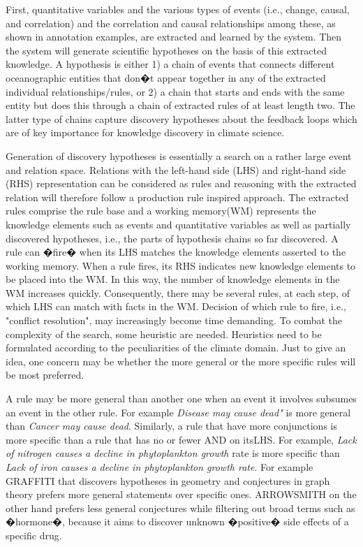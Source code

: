 \documentclass[10pt, a4paper]{article}
\begin{document}
First,  quantitative variables and the various types of events (i.e., change, causal, and correlation) and the correlation and causal relationships among these, as shown in annotation examples, are extracted and learned by the system.  
Then the system will generate scientific hypotheses on the basis of this extracted knowledge. 
A hypothesis is  either 1) a chain of events that connects  different oceanographic entities that don�t appear  together in any of the extracted individual relationships/rules, or  2) a chain that starts and ends with the same entity but does this  through a chain of extracted rules of at least length two.  
The latter type of chains capture discovery hypotheses about the feedback loops which are of key importance for knowledge discovery in  climate science.

Generation of discovery hypotheses is essentially a search on a rather large event and relation space. 
Relations with the left-hand side (LHS) and right-hand side (RHS) representation can be considered as rules and reasoning with the extracted relation will therefore follow a production rule inspired approach. 
The extracted rules comprise the rule base and a working memory(WM) represents the knowledge elements such as events and quantitative variables as well as partially discovered hypotheses, i.e., the parts of  hypothesis chains  so far discovered. 
A rule can �fire�  when its LHS matches the knowledge elements asserted to the working memory.  
When a rule fires, its RHS indicates new knowledge elements to be placed into the WM. In this way, the number of knowledge elements in the WM increases quickly. 
Consequently, there may be several rules, at each step,  of which LHS can match with facts in the WM. Decision of which rule to fire, i.e., "conflict resolution", may increasingly become time demanding. 
To combat the complexity of the search, some heuristic are needed. 
Heuristics need to be formulated according to the peculiarities of the climate domain. 
Just to give an idea, one  concern may be whether the more general or  the more specific rules will be most preferred. 

A rule may be more general than another one when an event it involves subsumes an event in the other rule.  
For example {\it Disease may cause dead"} is more general than {\it Cancer may cause dead}. Similarly,  a rule that have more conjunctions  is more specific than a rule that has no or fewer AND on itsLHS. 
For example, 
{\it Lack of nitrogen causes a decline in phytoplankton growth} rate is more specific than {\it Lack of iron causes a decline in phytoplankton growth rate}. 
For example GRAFFITI   that discovers hypotheses in geometry and conjectures in graph theory prefers more general statements over specific ones. 
ARROWSMITH on the other hand prefers less general conjectures while filtering out broad terms such as �hormone�, because it aims to discover  unknown �positive� side effects of a specific drug. 
\end{document}
